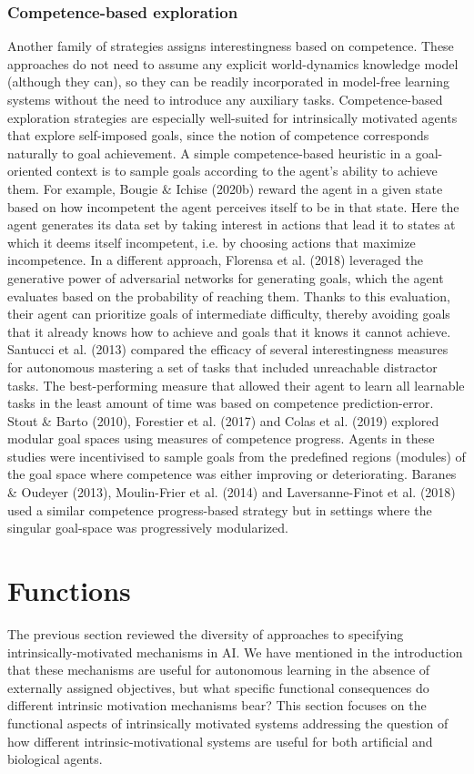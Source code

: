 \subsubsection{Competence-based exploration}
Another family of strategies assigns interestingness based on competence. These approaches do not need to assume any explicit world-dynamics knowledge model (although they can), so they can be readily incorporated in model-free learning systems without the need to introduce any auxiliary tasks. Competence-based exploration strategies are especially well-suited for intrinsically motivated agents that explore self-imposed goals, since the notion of competence corresponds naturally to goal achievement. A simple competence-based heuristic in a goal-oriented context is to sample goals according to the agent’s ability to achieve them. For example, Bougie \& Ichise (2020b) reward the agent in a given state based on how incompetent the agent perceives itself to be in that state. Here the agent generates its data set by taking interest in actions that lead it to states at which it deems itself incompetent, i.e. by choosing actions that maximize incompetence. In a different approach, Florensa et al. (2018) leveraged the generative power of adversarial networks for generating goals, which the agent evaluates based on the probability of reaching them. Thanks to this evaluation, their agent can prioritize goals of intermediate difficulty, thereby avoiding goals that it already knows how to achieve and goals that it knows it cannot achieve. Santucci et al. (2013) compared the efficacy of several interestingness measures for autonomous mastering a set of tasks that included unreachable distractor tasks. The best-performing measure that allowed their agent to learn all learnable tasks in the least amount of time was based on competence prediction-error. Stout \& Barto (2010), Forestier et al. (2017) and Colas et al. (2019) explored modular goal spaces using measures of competence progress. Agents in these studies were incentivised to sample goals from the predefined regions (modules) of the goal space where competence was either improving or deteriorating. Baranes \& Oudeyer (2013), Moulin-Frier et al. (2014) and Laversanne-Finot et al. (2018) used a similar competence progress-based strategy but in settings where the singular goal-space was progressively modularized.

\section{Functions}\label{sec:3-functions}
The previous section reviewed the diversity of approaches to specifying intrinsically-motivated mechanisms in \ac{AI}.  We have mentioned in the introduction that these mechanisms are useful for autonomous learning in the absence of externally assigned objectives, but what specific functional consequences do different intrinsic motivation mechanisms bear?  This section focuses on the functional aspects of intrinsically motivated systems addressing the question of how different intrinsic-motivational systems are useful for both artificial and biological agents.  


